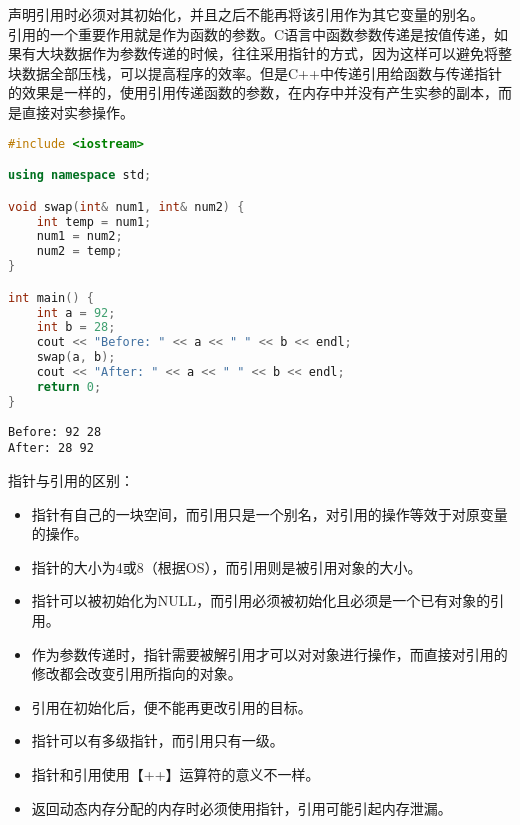 声明引用时必须对其初始化，并且之后不能再将该引用作为其它变量的别名。\\

引用的一个重要作用就是作为函数的参数。C语言中函数参数传递是按值传递，如果有大块数据作为参数传递的时候，往往采用指针的方式，因为这样可以避免将整块数据全部压栈，可以提高程序的效率。但是C++中传递引用给函数与传递指针的效果是一样的，使用引用传递函数的参数，在内存中并没有产生实参的副本，而是直接对实参操作。\\


\begin{lstlisting}[language=C++]
#include <iostream>

using namespace std;

void swap(int& num1, int& num2) {
    int temp = num1;
    num1 = num2;
    num2 = temp;
}

int main() {
    int a = 92;
    int b = 28;
    cout << "Before: " << a << " " << b << endl;
    swap(a, b);
    cout << "After: " << a << " " << b << endl;
    return 0;
}
\end{lstlisting}

\begin{tcolorbox}
	\begin{verbatim}
Before: 92 28
After: 28 92
	\end{verbatim}
\end{tcolorbox}

指针与引用的区别：

\begin{itemize}
	\item 指针有自己的一块空间，而引用只是一个别名，对引用的操作等效于对原变量的操作。

	\item 指针的大小为4或8（根据OS），而引用则是被引用对象的大小。

	\item 指针可以被初始化为NULL，而引用必须被初始化且必须是一个已有对象的引用。

	\item 作为参数传递时，指针需要被解引用才可以对对象进行操作，而直接对引用的修改都会改变引用所指向的对象。

	\item 引用在初始化后，便不能再更改引用的目标。

	\item 指针可以有多级指针，而引用只有一级。

	\item 指针和引用使用【++】运算符的意义不一样。

	\item 返回动态内存分配的内存时必须使用指针，引用可能引起内存泄漏。
\end{itemize}

